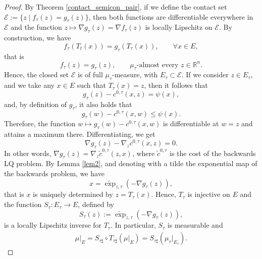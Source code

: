 \documentclass[reqno]{amsart}
\theoremstyle{plain}
\theoremstyle{definition}
\theoremstyle{remark}
\begin{document}
\begin{proof}
		By Theorem \ref{contact_semicon_pair}, if we define the contact set $\mathcal{E}:=\{z\;|\;f_\tau(z)=g_\tau(z)\}$, then both functions are differentiable everywhere in $\mathcal{E}$ and the function $z\mapsto \nabla g_\tau(z)=\nabla f_\tau(z)$ is locally Lipschitz on $\mathcal{E}$.
		By construction, we have 
		\begin{equation}
			f_\tau(T_t(x))=g_\tau(T_\tau(x)),\qquad\forall x\in E,
		\end{equation}
		that is 
		\begin{equation}
			f_\tau(z)=g_\tau(z),\qquad\mu_\tau\text{-almost every }z\in\mathbb{R}^n.
		\end{equation} 
		Hence, the closed set $\mathcal{E}$ is of full $\mu_\tau$-measure, with $E_\tau\subset\mathcal{E}$.
		If we consider $z\in E_\tau$, and we take any $x\in E$ such that $T_\tau(x)=z$, then it follows that
		\begin{equation}
			g_\tau(z)-c^{0,\tau}(x,z)=\psi(x),
		\end{equation}
		and, by definition of $g_\tau$, it also holds that 
		\begin{equation}
			g_\tau(w)-c^{0,\tau}(x,w)\leq\psi(x).
		\end{equation}
		Therefore, the function $w\mapsto g_\tau(w)-c^{0,\tau}(x,w)$ is differentiable at $w=z$ and attains a maximum there. Differentiating, we get
		\begin{equation}\label{fourth_contact_estimate}
			\nabla g_\tau(z)-\nabla_zc^{0,\tau}(x,z)=0.
		\end{equation}
         In other words, $\nabla g_\tau(z) = \nabla_z\tilde{c}^{0,\tau}(z,x)$, where $\tilde{c}^{0,\tau}$ is the cost of the backwards LQ problem. By Lemma \ref{lem2}, and denoting with a tilde the exponential map of the backwards problem, we have
		\begin{equation}
			x=\widetilde{\exp}_{z,\tau}(-\nabla g_\tau(z)),
		\end{equation}
		that is $x$ is uniquely determined by $z=T_\tau(x)$. Hence, $T_\tau$ is injective on $E$ and the function $S_\tau:E_\tau\to E$, defined by 
		\begin{equation}
			S_\tau(z):=\widetilde{\exp}_{z,\tau}(-\nabla g_\tau(z)),
		\end{equation}
		is a locally Lipschitz inverse for $T_\tau$.
		In particular, $S_\tau$ is measurable and 
		\begin{align}\label{inverse_of_tr_map}
			\mu|_E=S_{\tau\sharp}\circ T_{\tau\sharp}(\mu|_{E})=S_{\tau\sharp}(\mu_\tau|_{E_\tau}).
		\end{align}

\end{proof}
\end{document}
